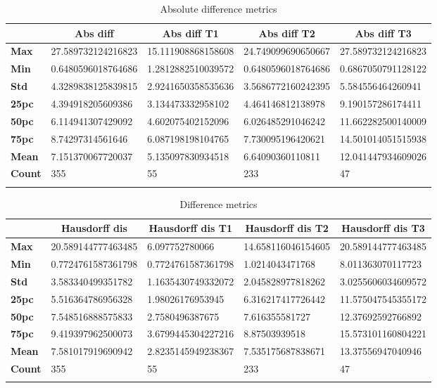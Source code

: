 \begin{longtable}[c]{|p{}|p{}|p{}|p{}|p{}|}
	\hline
	& \multicolumn{1}{c|}{\textbf{Abs diff}} & \multicolumn{1}{c|}{\textbf{Abs diff T1}} & \multicolumn{1}{c|}{\textbf{Abs diff T2}} & \multicolumn{1}{c|}{\textbf{Abs diff T3}} \\ \hline
	\endhead
	\textbf{Max} & 27.589732124216823 & 15.111908868158608 & 24.749099690650667 & 27.589732124216823 \\ \hline
	\textbf{Min} & 0.6480596018764686 & 1.2812882510039572 & 0.6480596018764686 & 0.6867050791128122 \\ \hline
	\textbf{Std} & 4.3289838125839815 & 2.9241650358535636 & 3.5686772160242395 & 5.584556464260941 \\ \hline
	\textbf{25pc} & 4.394918205609386 & 3.134473332958102 & 4.464146812138978 & 9.190157286174411 \\ \hline
	\textbf{50pc} & 6.114941307429092 & 4.602075402152096 & 6.026485291046242 & 11.662282500140009 \\ \hline
	\textbf{75pc} & 8.74297314561646 & 6.087198198104765 & 7.730095196420621 & 14.501014051515938 \\ \hline
	\textbf{Mean} & 7.151370067720037 & 5.135097830934518 & 6.64090360110811 & 12.041447934609026 \\ \hline
	\textbf{Count} & 355 & 55 & 233 & 47 \\ \hline
	
	
	\caption{Absolute difference metrics}
	\label{table:abs_diff}
\end{longtable}

\begin{longtable}[c]{|p{}|p{}|p{}|p{}|p{}|}
	\hline
	& \multicolumn{1}{c|}{\textbf{Hausdorff dis}} & \multicolumn{1}{c|}{\textbf{Hausdorff dis T1}} & \multicolumn{1}{c|}{\textbf{Hausdorff dis T2}} & \multicolumn{1}{c|}{\textbf{Hausdorff dis T3}} \\ \hline
	\endhead
	\textbf{Max} & 20.589144777463485 & 6.097752780066 & 14.658116046154605 & 20.589144777463485 \\ \hline
	\textbf{Min} & 0.7724761587361798 & 0.7724761587361798 & 1.0214043471768 & 8.011363070117723 \\ \hline
	\textbf{Std} & 3.583340499351782 & 1.1635430749332072 & 2.045828977818262 & 3.0255606034609572 \\ \hline
	\textbf{25pc} & 5.516364786956328 & 1.98026176953945 & 6.316217417726442 & 11.575047545355172 \\ \hline
	\textbf{50pc} & 7.548516888575833 & 2.7580496387675 & 7.616355581727 & 12.37692592766892 \\ \hline
	\textbf{75pc} & 9.419397962500073 & 3.6799445304227216 & 8.87503939518 & 15.573101160804221 \\ \hline
	\textbf{Mean} & 7.581017919690942 & 2.8235145949238367 & 7.535175687838671 & 13.37556947040946 \\ \hline
	\textbf{Count} & 355 & 55 & 233 & 47 \\ \hline
	
	
	\caption{Difference metrics}
	\label{table:difference}
\end{longtable}
	